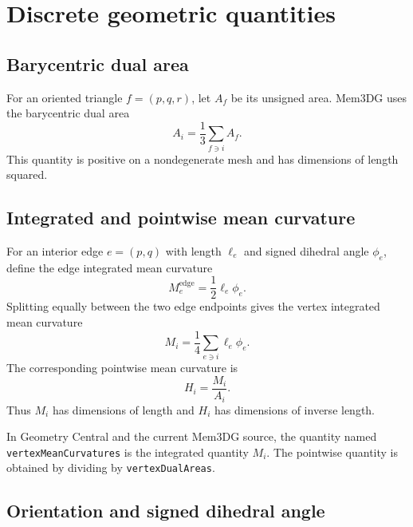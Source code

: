 \documentclass[11pt]{article}
\begin{document}
\section{Discrete geometric quantities}

\subsection{Barycentric dual area}

For an oriented triangle $f=(p,q,r)$, let $A_f$ be its unsigned area.  Mem3DG uses the barycentric dual area
\begin{equation}
  \boxed{
  A_i=\frac{1}{3}\sum_{f\ni i}A_f.}
  \label{eq:dual-area}
\end{equation}
This quantity is positive on a nondegenerate mesh and has dimensions of length squared.

\subsection{Integrated and pointwise mean curvature}

For an interior edge $e=(p,q)$ with length $\ell_e$ and signed dihedral angle $\phi_e$, define the edge integrated mean curvature
\begin{equation}
  M_e^{\mathrm{edge}}=\frac{1}{2}\ell_e\phi_e.
\end{equation}
Splitting equally between the two edge endpoints gives the vertex integrated mean curvature
\begin{equation}
  \boxed{
  M_i=\frac{1}{4}\sum_{e\ni i}\ell_e\phi_e.}
  \label{eq:integrated-mean-curvature}
\end{equation}
The corresponding pointwise mean curvature is
\begin{equation}
  \boxed{H_i=\frac{M_i}{A_i}.}
\end{equation}
Thus $M_i$ has dimensions of length and $H_i$ has dimensions of inverse length.

In Geometry Central and the current Mem3DG source, the quantity named \texttt{vertexMeanCurvatures} is the integrated quantity $M_i$.  The pointwise quantity is obtained by dividing by \texttt{vertexDualAreas}.

\subsection{Orientation and signed dihedral angle}
\end{document}
